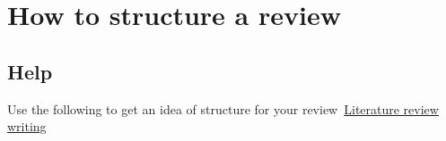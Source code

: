 \chapter{How to structure a review}\label{ch:Intro}

\section{Help}
Use the following to get an idea of structure for your review~\href{https://www.uts.edu.au/current-students/support/helps/self-help-resources/academic-writing/literature-review-writing}{Literature review writing}